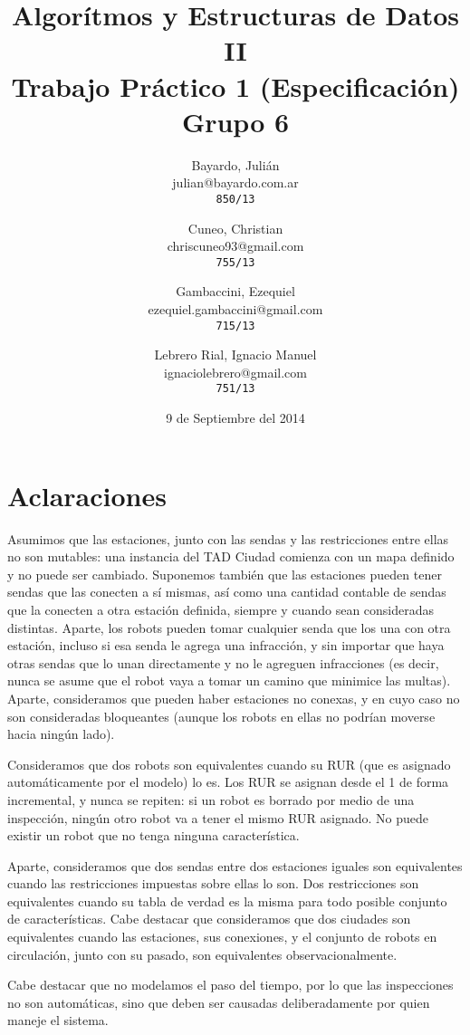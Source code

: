 \documentclass[a4paper,titlepage]{article}
\begin{document}
\title{Algorítmos y Estructuras de Datos II\\
Trabajo Práctico 1 (Especificación)\\
Grupo 6}

\author{
	Bayardo, Julián\\
	julian@bayardo.com.ar\\
	\texttt{850/13}
	\and
	Cuneo, Christian\\
	chriscuneo93@gmail.com\\
	\texttt{755/13}
	\and
	Gambaccini, Ezequiel\\
	ezequiel.gambaccini@gmail.com\\
	\texttt{715/13}
	\and
	Lebrero Rial, Ignacio Manuel\\
	ignaciolebrero@gmail.com\\
	\texttt{751/13}
}

\date{9 de Septiembre del 2014}

\maketitle

\section{Aclaraciones}

Asumimos que las estaciones, junto con las sendas y las restricciones entre ellas no son mutables: una instancia del TAD Ciudad comienza con un mapa definido y no puede ser cambiado. Suponemos también que las estaciones pueden tener sendas que las conecten a sí mismas, así como una cantidad contable de sendas que la conecten a otra estación definida, siempre y cuando sean consideradas distintas. Aparte, los robots pueden tomar cualquier senda que los una con otra estación, incluso si esa senda le agrega una infracción, y sin importar que haya otras sendas que lo unan directamente y no le agreguen infracciones (es decir, nunca se asume que el robot vaya a tomar un camino que minimice las multas). Aparte, consideramos que pueden haber estaciones no conexas, y en cuyo caso no son consideradas bloqueantes (aunque los robots en ellas no podrían moverse hacia ningún lado).

Consideramos que dos robots son equivalentes cuando su RUR (que es asignado automáticamente por el modelo) lo es. Los RUR se asignan desde el 1 de forma incremental, y nunca se repiten: si un robot es borrado por medio de una inspección, ningún otro robot va a tener el mismo RUR asignado. No puede existir un robot que no tenga ninguna característica.

Aparte, consideramos que dos sendas entre dos estaciones iguales son equivalentes cuando las restricciones impuestas sobre ellas lo son. Dos restricciones son equivalentes cuando su tabla de verdad es la misma para todo posible conjunto de características. Cabe destacar que consideramos que dos ciudades son equivalentes cuando las estaciones, sus conexiones, y el conjunto de robots en circulación, junto con su pasado, son equivalentes observacionalmente.

Cabe destacar que no modelamos el paso del tiempo, por lo que las inspecciones no son automáticas, sino que deben ser causadas deliberadamente por quien maneje el sistema.
\end{document}
